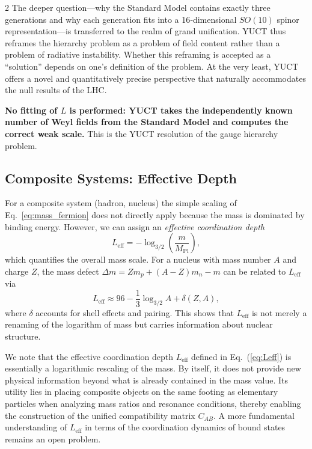 \documentclass[11pt,a4paper]{article}
\begin{document}
\begin{multicols}{2}
		The deeper question—why the Standard Model contains exactly three generations and why each generation fits into a 16‑dimensional \(SO(10)\) spinor representation—is transferred to the realm of grand unification. YUCT thus reframes the hierarchy problem as a problem of field content rather than a problem of radiative instability. Whether this reframing is accepted as a ``solution'' depends on one's definition of the problem. At the very least, YUCT offers a novel and quantitatively precise perspective that naturally accommodates the null results of the LHC.
		
		\textbf{No fitting of $L$ is performed: YUCT takes the independently known number of Weyl fields from the Standard Model and computes the correct weak scale.} This is the YUCT resolution of the gauge hierarchy problem.
		
		\subsection{Composite Systems: Effective Depth}
		
		For a composite system (hadron, nucleus) the simple scaling of Eq.~\eqref{eq:mass_fermion} does not directly apply because the mass is dominated by binding energy. However, we can assign an \emph{effective coordination depth}
		\begin{equation}
			L_{\mathrm{eff}} = -\log_{3/2}\left( \frac{m}{M_{\mathrm{Pl}}} \right),
			\label{eq:Leff}
		\end{equation}
		which quantifies the overall mass scale. For a nucleus with mass number \(A\) and charge \(Z\), the mass defect \(\Delta m = Z m_p + (A-Z) m_n - m\) can be related to \(L_{\mathrm{eff}}\) via
		\begin{equation}
			L_{\mathrm{eff}} \approx 96 - \frac{1}{3} \log_{3/2} A + \delta(Z,A),
		\end{equation}
		where \(\delta\) accounts for shell effects and pairing. This shows that \(L_{\mathrm{eff}}\) is not merely a renaming of the logarithm of mass but carries information about nuclear structure.
		
		We note that the effective coordination depth \(L_{\mathrm{eff}}\) defined in Eq.~(\ref{eq:Leff}) is essentially a logarithmic rescaling of the mass. By itself, it does not provide new physical information beyond what is already contained in the mass value. Its utility lies in placing composite objects on the same footing as elementary particles when analyzing mass ratios and resonance conditions, thereby enabling the construction of the unified compatibility matrix \(C_{AB}\). A more fundamental understanding of \(L_{\mathrm{eff}}\) in terms of the coordination dynamics of bound states remains an open problem.
		
	\end{multicols}
	
\end{document}
